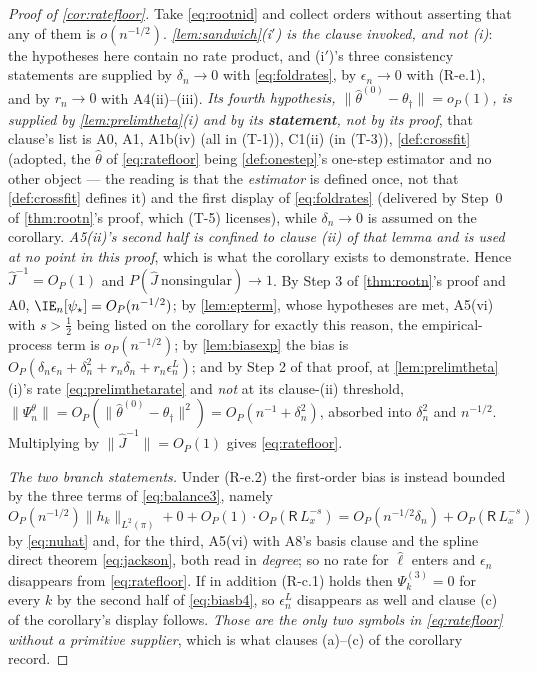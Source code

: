 \begin{proof}[Proof of \cref{cor:ratefloor}]
Take \eqref{eq:rootnid} and collect orders without asserting that any of them is $o(n^{-1/2})$.
\emph{\cref{lem:sandwich}\textup{(i$'$)} is the clause invoked, and not \textup{(i)}}: the hypotheses here
contain no rate product, and (i$'$)'s three consistency statements are supplied by $\delta_n\to0$ with
\eqref{eq:foldrates}, by $\epsilon_n\to0$ with (R-e.1), and by $r_n\to0$ with A4(ii)--(iii). \emph{Its
fourth hypothesis, $\|\hat\theta^{(0)}-\theta_\dagger\|=o_P(1)$, is supplied by
\cref{lem:prelimtheta}\textup{(i)} and by its \textbf{statement}, not by its proof}, that clause's list is
A0, A1, A1b(iv) (all in (T-1)), C1(ii) (in (T-3)), \cref{def:crossfit} (adopted, the $\hat\theta$ of
\eqref{eq:ratefloor} being \cref{def:onestep}'s one-step estimator and no other object --- the
reading is that the \emph{estimator} is defined once, not that \cref{def:crossfit} defines it) and the first display of \eqref{eq:foldrates} (delivered by
Step~0 of \cref{thm:rootn}'s proof, which (T-5) licenses), while $\delta_n\to0$ is assumed on the corollary.
\emph{A5(ii)'s second half is confined to clause \textup{(ii)} of that lemma and is used at no point in
this proof}, which is what the corollary exists to demonstrate. Hence
$\hat J^{-1}=O_P(1)$ and $P(\hat J\ \text{nonsingular})\to1$. By Step 3 of
\cref{thm:rootn}'s proof and A0, $\IE_n[\psi_\star]=O_P(n^{-1/2})$; by \cref{lem:epterm}, whose
hypotheses are met, A5(vi) with $s>\tfrac12$ being listed on the corollary for exactly this reason, the
empirical-process term is $o_P(n^{-1/2})$; by \cref{lem:biasexp} the bias is
$O_P(\delta_n\epsilon_n+\delta_n^{2}+r_n\delta_n+r_n\epsilon^{L}_n)$; and by Step 2 of that proof, at
\cref{lem:prelimtheta}\textup{(i)}'s rate \eqref{eq:prelimthetarate} and \emph{not} at its clause-(ii)
threshold, $\|\Psi^{\theta}_n\|=O_P(\|\hat\theta^{(0)}-\theta_\dagger\|^{2})=O_P(n^{-1}+\delta_n^{2})$,
absorbed into $\delta_n^{2}$ and $n^{-1/2}$. Multiplying by $\|\hat J^{-1}\|=O_P(1)$ gives
\eqref{eq:ratefloor}.

\emph{The two branch statements.} Under (R-e.2) the first-order bias is instead bounded by the three terms of
\eqref{eq:balance3}, namely
$O_P(n^{-1/2})\|h_k\|_{L^{2}(\pi)}+0+O_P(1)\cdot O_P(\mathsf R\,L_x^{-s})=O_P(n^{-1/2}\delta_n)+O_P(\mathsf R\,L_x^{-s})$
by \eqref{eq:nuhat} and, for the third, A5(vi) with A8's basis clause and the spline direct theorem
\eqref{eq:jackson}, both read in \emph{degree}; so no
rate for $\hat\ell$ enters and $\epsilon_n$ disappears from \eqref{eq:ratefloor}. If in addition (R-c.1)
holds then $\Psi^{(3)}_k=0$ for every $k$ by the second half of \eqref{eq:biasb4}, so $\epsilon^{L}_n$
disappears as well and clause (c) of the corollary's display follows. \emph{Those are the only two symbols in
\eqref{eq:ratefloor} without a primitive supplier}, which is what clauses (a)--(c) of the corollary record.
\end{proof}


